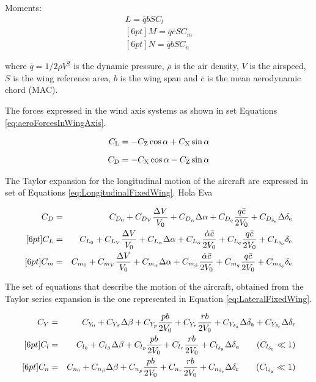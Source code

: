 \noindent
Moments:
\begin{eqnarray}
L = \bar{q} b S C_l \\ [6pt]
M = \bar{q} \bar{c} S C_m \\ [6pt]
N = \bar{q} b S C_n
\end{eqnarray}

\noindent
where $\bar{q}=1/2 \rho V^2$ is the dynamic pressure, $\rho$ is the air density, $V$ is the airspeed, $S$ is the wing reference area, $b$ is the wing span and $\bar{c}$ is the mean aerodynamic chord (MAC). 

The forces expressed in the wind axis systems as shown in set Equations \ref{eq:aeroForcesInWingAxis}. 

\begin{eqnarray} \label{eq:aeroForcesInWingAxis}
C_{\mathrm{L}} = - C_{\mathrm{Z}} \cos \alpha + C_{\mathrm{X}} \sin \alpha \nonumber \\[6pt]
C_{\mathrm{D}} = - C_{\mathrm{X}} \cos \alpha - C_{\mathrm{Z}} \sin \alpha
\end{eqnarray}

The Taylor expansion for the longitudinal motion of the aircraft are expressed in set of Equations \ref{eq:LongitudinalFixedWing}. Hola Eva

\begin{eqnarray} \label{eq:LongitudinalFixedWing}
C_D &=& C_{D_0} + C_{D_V} \frac{\Delta V}{V_0} + C_{D_\alpha} \Delta \alpha + C_{D_q} \frac{q \bar{c}}{2 V_0} + C_{D_{\delta_{\mathrm{e}}} }\Delta \delta_{\mathrm{e}} \nonumber \\ [6pt]
C_L &=& C_{L_0} + C_{L_V} \frac{\Delta V}{V_0} + C_{L_\alpha} \Delta \alpha + C_{L_{\dot{\alpha}}} \frac{\dot{\alpha} \bar{c} }{2 V_0} + C_{L_q} \frac{q \bar{c}}{2 V_0} + C_{L_{\delta_{\mathrm{e}}}} \delta_{\mathrm{e}} \nonumber \\ [6pt]
C_m &=& C_{m_0} + C_{m_V} \frac{\Delta V}{V_0} + C_{m_\alpha} \Delta \alpha + C_{m_{\dot{\alpha}}} \frac{\dot{\alpha} \bar{c} }{2 V_0} + C_{m_q} \frac{q \bar{c}}{2 V_0} + C_{m_{\delta_{\mathrm{e}}}} \delta_{\mathrm{e}} 
\end{eqnarray}

The set of equations that describe the motion of the aircraft, obtained from the Taylor series expansion is the one represented in Equation \ref{eq:LateralFixedWing}.

\begin{eqnarray} \label{eq:LateralFixedWing}
C_Y &=& C_{Y_0} + C_{Y_\beta}\Delta\beta + C_{Y_p}\frac{pb}{2V_0} + C_{Y_r}\frac{rb}{2V_0} + C_{Y_{\delta_{\mathrm{a}}} }\Delta \delta_{\mathrm{a}} + C_{Y_{\delta_{\mathrm{r}}} }\Delta \delta_{\mathrm{r}} \nonumber \\ [6pt]
C_l &=& C_{l_0} + C_{l_\beta}\Delta\beta + C_{l_p}\frac{pb}{2V_0} + C_{l_r}\frac{rb}{2V_0} + C_{l_{\delta_{\mathrm{a}}} }\Delta \delta_{\mathrm{a}} \qquad (C_{l_{\delta_{\mathrm{r}}}} \ll 1) \nonumber \\ [6pt]
C_n &=& C_{n_0} + C_{n_\beta}\Delta\beta + C_{n_p}\frac{pb}{2V_0} + C_{n_r}\frac{rb}{2V_0} + C_{n_{\delta_{\mathrm{r}}} }\Delta \delta_{\mathrm{r}} \qquad (C_{l_{\delta_{\mathrm{a}}}} \ll 1)
\end{eqnarray}


